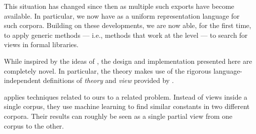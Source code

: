 This situation has changed since then as multiple such exports have become available.
In particular, we now have \ommt %
as a uniform representation language for such corpora.
Building on these developments, we are now able, for the first time, to apply generic methods --- i.e., methods that work at the \mmt level --- to search for views in formal libraries.

While inspired by the ideas of \cite{NorKoh:efnrsmk07}, the design and implementation presented here are completely novel.
In particular, the theory makes use of the rigorous language-independent definitions of \emph{theory} and \emph{view} provided by \mmt.

\cite{hol_isahol_matching} applies techniques related to ours to a related problem.
Instead of views inside a single corpus, they use machine learning to find similar constants in two different corpora.
Their results can roughly be seen as a single partial view from one corpus to the other.

%



